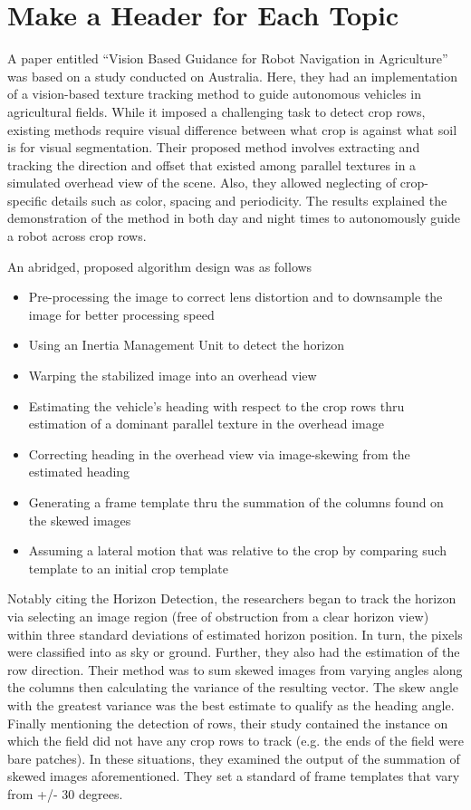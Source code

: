 \section{Make a Header for Each Topic}

A paper entitled “Vision Based Guidance for Robot Navigation in Agriculture” was based on a study conducted on Australia. Here, they had an implementation of a vision-based texture tracking method to guide autonomous vehicles in agricultural fields. While it imposed a challenging task to detect crop rows, existing methods require visual difference between what crop is against what soil is for visual segmentation. Their proposed method involves extracting and tracking the direction and offset that existed among parallel textures in a simulated overhead view of the scene. Also, they allowed neglecting of crop-specific details such as color, spacing and periodicity. The results explained the demonstration of the method in both day and night times to autonomously guide a robot across crop rows.
 
    An abridged, proposed algorithm design was as follows
\begin{itemize}
\item Pre-processing the image to correct lens distortion and to downsample the image for better processing speed\item Using an Inertia Management Unit to detect the horizon
\item Warping the stabilized image into an overhead view
\item Estimating the vehicle’s heading with respect to the crop rows thru estimation of a dominant parallel texture in the overhead image
\item Correcting heading in the overhead view via image-skewing from the estimated heading
\item Generating a frame template thru the summation of the columns found on the skewed images
\item Assuming a lateral motion that was relative to the crop by comparing such template to an initial crop template
\end{itemize}
\tab Notably citing the Horizon Detection, the researchers began to track the horizon via selecting an image region (free of obstruction from a clear horizon view) within three standard deviations of estimated horizon position. In turn, the pixels were classified into as sky or ground. Further, they also had the estimation of the row direction. Their method was to sum skewed images from varying angles along the columns then calculating the variance of the resulting vector. The skew angle with the greatest variance was the best estimate to qualify as the heading angle. Finally mentioning the detection of rows, their study contained the instance on which the field did not have any crop rows to track (e.g. the ends of the field were bare patches). In these situations, they examined the output of the summation of skewed images aforementioned. They set a standard of frame templates that vary from +/- 30 degrees.
 
